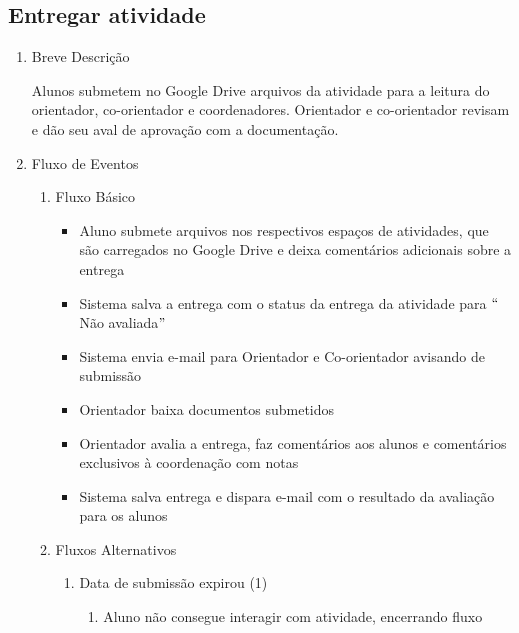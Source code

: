 \subsection{Entregar atividade}


\begin{enumerate}
    \item Breve Descrição


Alunos submetem no Google Drive arquivos da atividade para a leitura do orientador, co-orientador e coordenadores. Orientador e co-orientador revisam e dão seu aval de aprovação com a documentação.


    \item Fluxo de Eventos

\begin{enumerate}
    \item Fluxo Básico

\begin{itemize}
    \item Aluno submete arquivos nos respectivos espaços de atividades, que são carregados no Google Drive e deixa comentários adicionais sobre a entrega

    \item Sistema salva a entrega com o status da entrega da atividade para $``$Não avaliada$"$ 

    \item Sistema envia e-mail para Orientador e Co-orientador avisando de submissão

    \item Orientador baixa documentos submetidos

    \item Orientador avalia a entrega, faz comentários aos alunos e comentários exclusivos à coordenação com notas

    \item Sistema salva entrega e dispara e-mail com o resultado da avaliação para os alunos
\end{itemize}


    \item Fluxos Alternativos

\begin{enumerate}
    \item Data de submissão expirou (1)

\begin{enumerate}
    \item Aluno não consegue interagir com atividade, encerrando fluxo



\end{enumerate}
\end{enumerate}
\end{enumerate}
\end{enumerate}
